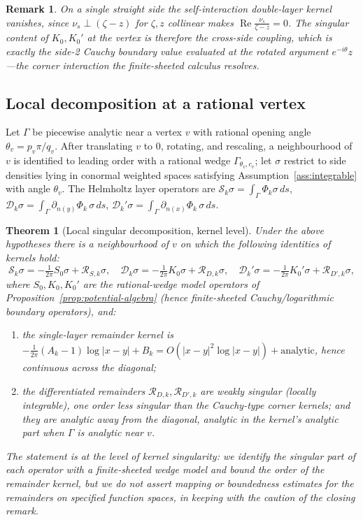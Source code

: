 \documentclass[pdflatex,sn-mathphys-num]{sn-jnl}%
\newcommand{\Real}{\operatorname{Re}}
\theoremstyle{thmstyleone}
\newtheorem{theorem}{Theorem}
\theoremstyle{thmstyletwo}
\newtheorem{remark}{Remark}
\theoremstyle{thmstylethree}
\begin{document}
\begin{remark}
On a single straight side the self-interaction double-layer kernel vanishes,
since $\nu_s\perp(\zeta-z)$ for $\zeta,z$ collinear makes
$\Real\frac{\nu_s}{\zeta-z}=0$. The singular content of $K_0,K_0'$ at the vertex
is therefore the cross-side coupling, which is exactly the side-2 Cauchy
boundary value evaluated at the rotated argument $e^{-i\theta}z$---the corner
interaction the finite-sheeted calculus resolves.
\end{remark}

\subsection{Local decomposition at a rational vertex}
Let $\Gamma$ be piecewise analytic near a vertex $v$ with rational opening angle
$\theta_v=p_v\pi/q_v$. After translating $v$ to $0$, rotating, and rescaling, a
neighbourhood of $v$ is identified to leading order with a rational wedge
$\Gamma_{\theta_v,c_v}$; let $\sigma$ restrict to side densities lying in
conormal weighted spaces satisfying Assumption~\ref{ass:integrable} with angle
$\theta_v$. The Helmholtz layer operators are
$\mathcal S_k\sigma=\int_\Gamma\Phi_k\sigma\,ds$,
$\mathcal D_k\sigma=\int_\Gamma\partial_{n(y)}\Phi_k\,\sigma\,ds$,
$\mathcal D_k'\sigma=\int_\Gamma\partial_{n(x)}\Phi_k\,\sigma\,ds$.

\begin{theorem}[Local singular decomposition, kernel level]\label{thm:helmholtz}
Under the above hypotheses there is a neighbourhood of $v$ on which the
following identities of kernels hold:
\begin{equation}\label{eq:helmholtz-decomp}
  \mathcal S_k\sigma=-\tfrac{1}{2\pi}S_0\sigma+\mathcal R_{S,k}\sigma,\quad
  \mathcal D_k\sigma=-\tfrac{1}{2\pi}K_0\sigma+\mathcal R_{D,k}\sigma,\quad
  \mathcal D_k'\sigma=-\tfrac{1}{2\pi}K_0'\sigma+\mathcal R_{D',k}\sigma,
\end{equation}
where $S_0,K_0,K_0'$ are the rational-wedge model operators of
Proposition~\ref{prop:potential-algebra} (hence finite-sheeted Cauchy/logarithmic
boundary operators), and:
\begin{enumerate}
\item the single-layer remainder kernel is
$-\tfrac{1}{2\pi}(A_k-1)\log|x-y|+B_k=O(|x-y|^{2}\log|x-y|)+\text{analytic}$,
hence continuous across the diagonal;
\item the differentiated remainders $\mathcal R_{D,k},\mathcal R_{D',k}$ are
weakly singular (locally integrable), one order less singular than the
Cauchy-type corner kernels; and they are analytic away from the diagonal,
analytic in the kernel's analytic part when $\Gamma$ is analytic near $v$.
\end{enumerate}
The statement is at the level of kernel singularity: we identify the singular
part of each operator with a finite-sheeted wedge model and bound the order of
the remainder kernel, but we do not assert mapping or boundedness estimates for
the remainders on specified function spaces, in keeping with the caution of the
closing remark.
\end{theorem}
\end{document}
